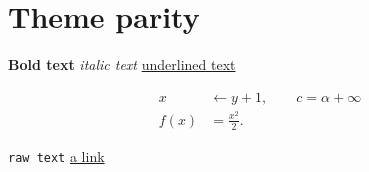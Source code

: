 \documentclass{article}
\begin{document}
\section{Theme parity}

\textbf{Bold text} \textit{italic text} \underline{underlined text}

\begin{align*}
  x &\leftarrow y + 1, \qquad c = \alpha + \infty \\
  f(x) &= \frac{x^2}{2}.
\end{align*}

\verb|raw text| \href{https://example.com}{a link}
\end{document}
